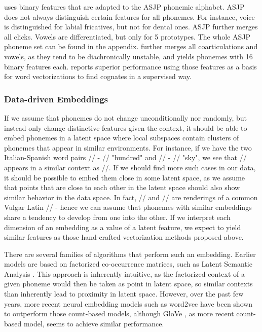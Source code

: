 \documentclass[6pt]{article}
\begin{document}
\cite{rama2016siamese} uses binary features that are adapted to the ASJP phonemic alphabet. ASJP does not always distinguish certain features for all phonemes. For instance, voice is distinguished for labial fricatives, but not for dental ones. ASJP further merges all clicks. Vowels are differentiated, but only for 5 prototypes. The whole ASJP phoneme set can be found in the appendix. \cite{rama2016siamese} further merges all coarticulations and vowels, as they tend to be diachronically unstable, and yields phonemes with 16 binary features each. \cite{rama2016siamese} reports superior performance using those features as a basis for word vectorizations to find cognates in a supervised way.
\subsubsection{Data-driven Embeddings}




If we assume that phonemes do not change unconditionally nor randomly, but instead only change distinctive features given the context, it should be able to embed phonemes in a latent space where local subspaces contain clusters of phonemes that appear in similar environments. For instance, if we have the two Italian-Spanish word pairs // - // "hundred" and  // - // "sky", we see that // appears in a similar context as //. If we should find more such cases in our data, it should be possible to embed them close in some latent space, as we assume that points that are close to each other in the latent space should also show similar behavior in the data space. In fact, // and // are renderings of a common Vulgar Latin // - hence we can assume that phonemes with similar embeddings share a tendency to develop from one into the other. If we interpret each dimension of an embedding as a value of a latent feature, we expect to yield similar features as those hand-crafted vectorization methods proposed above.



There are several families of algorithms that perform such an embedding. Earlier models are based on factorized co-occurrence matrices, such as Latent Semantic Analysis \cite{landauer2013handbook}. This approach is inherently intuitive, as the factorized context of a given phoneme would then be taken as point in latent space, so similar contexts than inherently lead to proximity in latent space. However, over the past few years, more recent neural embedding models such as word2vec \cite{mikolov2013efficient,mikolov2013distributed,goldberg2014word2vec}  have been shown to outperform those count-based models, although GloVe \cite{pennington2014glove}, as more recent count-based model, seems to achieve similar performance.
\end{document}
